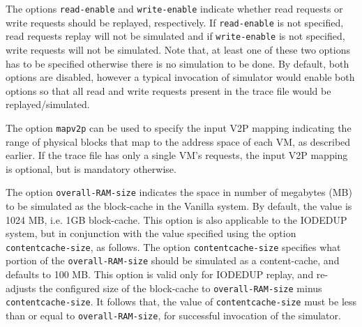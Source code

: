 The options \texttt{read-enable} and \texttt{write-enable} indicate whether
read requests or write requests should be replayed, respectively. If 
\texttt{read-enable} is not specified, read requests replay will not be 
simulated and if \texttt{write-enable} is not specified, write requests 
will not be simulated. Note that, at least one of these two options 
has to be specified otherwise there is no simulation to be done.
By default, both options are disabled, however a typical invocation of
simulator would enable both options so that all read and
write requests present in the trace file would be replayed/simulated.

The option \texttt{mapv2p} can be used to specify the input V2P mapping
indicating the range of physical blocks that map to the address space of 
each VM, as described earlier.
If the trace file has only a single VM's requests, the input V2P
mapping is optional, but is mandatory otherwise.

The option \texttt{overall-RAM-size} indicates the space in 
number of megabytes (MB) to be simulated as the block-cache in the
Vanilla system. By default, the value is 1024 MB, i.e. 1GB block-cache.
This option is also applicable to the IODEDUP system, but in conjunction
with the value specified using the option \texttt{contentcache-size},
as follows. The option \texttt{contentcache-size} specifies what portion
of the \texttt{overall-RAM-size} should be simulated as a content-cache,
and defaults to 100 MB.
This option is valid only for IODEDUP replay, and re-adjusts the configured
size of the block-cache to \texttt{overall-RAM-size} minus 
\texttt{contentcache-size}. It follows that, the value of 
\texttt{contentcache-size} must be less than or equal to 
\texttt{overall-RAM-size}, for successful invocation of the simulator.


